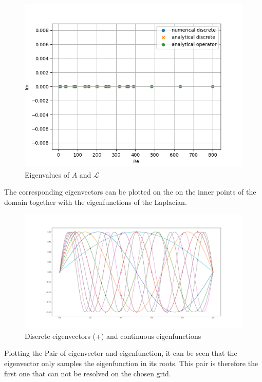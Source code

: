 \documentclass{article}
\begin{document}
\begin{figure}[H]
    \centering
    \includegraphics[width=.9\linewidth]{eigenvals.png}
    \caption{Eigenvalues of $A$ and $\mathcal{L}$}
\end{figure}
The corresponding eigenvectors can be plotted on the on the inner points of the domain together with the eigenfunctions of the Laplacian.
\begin{figure}[H]
    \centering
    \includegraphics[width=.9\linewidth]{Eigenfuncs.png}
    \caption{Discrete eigenvectors (+) and continuous eigenfunctions}
\end{figure}

Plotting the  Pair of eigenvector and eigenfunction, it can be seen that the eigenvector only samples the eigenfunction in its roots.  This pair is therefore the first one that can not be resolved on the chosen grid.
\end{document}
